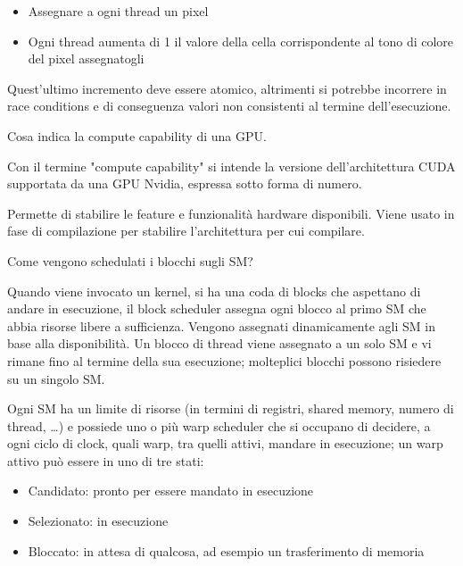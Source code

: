 \begin{questions}
\begin{solution}
\begin{itemize}
    		\item Assegnare a ogni thread un pixel
    		
    		\item Ogni thread aumenta di 1 il valore della cella corrispondente al tono di colore del pixel assegnatogli
    	\end{itemize}
    	
    	Quest'ultimo incremento deve essere atomico, altrimenti si potrebbe incorrere in race conditions e di conseguenza valori non consistenti al termine dell'esecuzione.
    \end{solution}
    
    \question Cosa indica la compute capability di una GPU.
    
    \begin{solution}
        Con il termine "compute capability" si intende la versione dell'architettura CUDA supportata da una GPU Nvidia, espressa sotto forma di numero.
        
        Permette di stabilire le feature e funzionalità hardware disponibili. Viene usato in fase di compilazione per stabilire l'architettura per cui compilare.
    \end{solution}
    
    \question Come vengono schedulati i blocchi sugli SM?
    
    \begin{solution}
        Quando viene invocato un kernel, si ha una coda di blocks che aspettano di andare in esecuzione, il block scheduler assegna ogni blocco al primo SM che abbia risorse libere a sufficienza. Vengono assegnati dinamicamente agli SM in base alla disponibilità. Un blocco di thread viene assegnato a un solo SM e vi rimane fino al termine della sua esecuzione; molteplici blocchi possono risiedere su un singolo SM.
        
        Ogni SM ha un limite di risorse (in termini di registri, shared memory, numero di thread, \dots) e possiede uno o più warp scheduler che si occupano di decidere, a ogni ciclo di clock, quali warp, tra quelli attivi, mandare in esecuzione; un warp attivo può essere in uno di tre stati: 
        \begin{itemize}
            \item Candidato: pronto per essere mandato in esecuzione
            
            \item Selezionato: in esecuzione
            
            \item Bloccato: in attesa di qualcosa, ad esempio un trasferimento di memoria
        \end{itemize}
        

\end{solution}
\end{questions}

